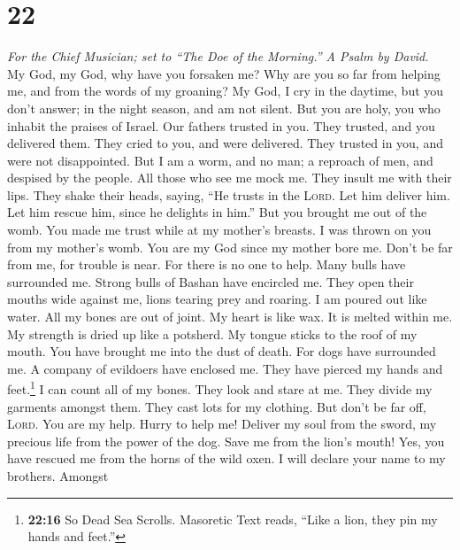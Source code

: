 \hypertarget{section-21}{%
\section{22}\label{section-21}}

\emph{For the Chief Musician; set to ``The Doe of the Morning.'' A Psalm
by David.}\\
 My God, my God, why have you forsaken me? Why are you so
far from helping me, and from the words of my groaning? 
My God, I cry in the daytime, but you don't answer; in the night season,
and am not silent.  But you are holy, you who inhabit the
praises of Israel.  Our fathers trusted in you. They
trusted, and you delivered them.  They cried to you, and
were delivered. They trusted in you, and were not disappointed.
 But I am a worm, and no man; a reproach of men, and
despised by the people.  All those who see me mock me.
They insult me with their lips. They shake their heads, saying,
 ``He trusts in the \textsc{Lord}. Let him deliver him.
Let him rescue him, since he delights in him.''  But you
brought me out of the womb. You made me trust while at my mother's
breasts.  I was thrown on you from my mother's womb. You
are my God since my mother bore me.  Don't be far from
me, for trouble is near. For there is no one to help. 
Many bulls have surrounded me. Strong bulls of Bashan have encircled me.
 They open their mouths wide against me, lions tearing
prey and roaring.  I am poured out like water. All my
bones are out of joint. My heart is like wax. It is melted within me.
 My strength is dried up like a potsherd. My tongue
sticks to the roof of my mouth. You have brought me into the dust of
death.  For dogs have surrounded me. A company of
evildoers have enclosed me. They have pierced my hands and
feet.\footnote{\textbf{22:16} So Dead Sea Scrolls. Masoretic Text reads,
  ``Like a lion, they pin my hands and feet.''}  I can
count all of my bones. They look and stare at me.  They
divide my garments amongst them. They cast lots for my clothing.
 But don't be far off, \textsc{Lord}. You are my help.
Hurry to help me!  Deliver my soul from the sword, my
precious life from the power of the dog.  Save me from
the lion's mouth! Yes, you have rescued me from the horns of the wild
oxen.  I will declare your name to my brothers. Amongst
